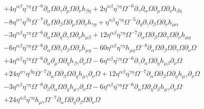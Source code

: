 \documentclass[10pt,letterpaper]{article}
\begin{document}
\begin{align}
& + 4 \eta^{\alpha \beta} \eta^{\gamma \eta} \Omega^{-6} \partial_{\alpha}\Omega \partial_{\gamma}\partial_{\mu}\Omega \partial_{\nu}h_{\beta \eta}
 + 2 \eta^{\alpha \beta} \eta^{\gamma \eta} \Omega^{-6} \partial_{\gamma}\partial_{\alpha}\Omega \partial_{\mu}\Omega \partial_{\nu}h_{\beta \eta}\nonumber\\
& - 8 \eta^{\alpha \gamma} \eta^{\beta \eta} \Omega^{-7} \partial_{\alpha}\Omega \partial_{\beta}\Omega \partial_{\mu}\Omega \partial_{\nu}h_{\gamma \eta}
 + \eta^{\alpha \beta} \eta^{\gamma \eta} \Omega^{-5} \partial_{\eta}\partial_{\gamma}\partial_{\beta}\Omega \partial_{\nu}h_{\mu \alpha}\nonumber\\
& - 3 \eta^{\alpha \beta} \eta^{\gamma \eta} \Omega^{-6} \partial_{\alpha}\Omega \partial_{\eta}\partial_{\gamma}\Omega \partial_{\nu}h_{\mu \beta}
 + 12 \eta^{\alpha \beta} \eta^{\gamma \eta} \Omega^{-7} \partial_{\alpha}\Omega \partial_{\beta}\Omega \partial_{\gamma}\Omega \partial_{\nu}h_{\mu \eta}\nonumber\\
& - 6 \eta^{\alpha \beta} \eta^{\gamma \eta} \Omega^{-6} \partial_{\alpha}\Omega \partial_{\gamma}\partial_{\beta}\Omega \partial_{\nu}h_{\mu \eta}
 - 60 \eta^{\alpha \beta} \eta^{\gamma \eta} h_{\mu \eta} \Omega^{-8} \partial_{\alpha}\Omega \partial_{\beta}\Omega \partial_{\gamma}\Omega \partial_{\nu}\Omega\nonumber\\
& + 4 \eta^{\alpha \beta} \eta^{\gamma \eta} \Omega^{-6} \partial_{\alpha}\partial_{\mu}\Omega \partial_{\eta}h_{\beta \gamma} \partial_{\nu}\Omega
 - 6 \eta^{\alpha \beta} \eta^{\gamma \eta} \Omega^{-6} \partial_{\gamma}\partial_{\alpha}\Omega \partial_{\eta}h_{\mu \beta} \partial_{\nu}\Omega\nonumber\\
& + 24 \eta^{\alpha \gamma} \eta^{\beta \eta} \Omega^{-7} \partial_{\alpha}\Omega \partial_{\beta}\Omega \partial_{\eta}h_{\mu \gamma} \partial_{\nu}\Omega
 + 12 \eta^{\alpha \beta} \eta^{\gamma \eta} \Omega^{-7} \partial_{\alpha}\Omega \partial_{\beta}\Omega \partial_{\eta}h_{\mu \gamma} \partial_{\nu}\Omega\nonumber\\
& - 3 \eta^{\alpha \beta} \eta^{\gamma \eta} \Omega^{-6} \partial_{\beta}\partial_{\alpha}\Omega \partial_{\eta}h_{\mu \gamma} \partial_{\nu}\Omega
 - 6 \eta^{\alpha \beta} \eta^{\gamma \eta} \Omega^{-6} \partial_{\alpha}\Omega \partial_{\eta}\partial_{\beta}h_{\mu \gamma} \partial_{\nu}\Omega\nonumber\\
& + 24 \eta^{\alpha \beta} \eta^{\gamma \eta} h_{\mu \gamma} \Omega^{-7} \partial_{\alpha}\Omega \partial_{\eta}\partial_{\beta}\Omega \partial_{\nu}\Omega

\end{align}
\end{document}
